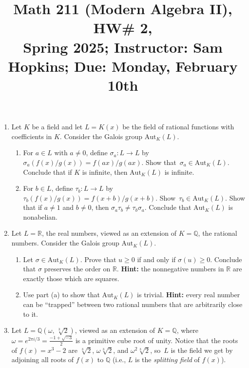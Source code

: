 \documentclass[11pt]{article}
\title{Math 211 (Modern Algebra II), HW\# 2, \\ {\normalsize Spring 2025; Instructor: Sam Hopkins; Due: Monday, February 10th}}
\date{}
\begin{document}
\maketitle

\thispagestyle{empty}

\begin{enumerate}

\item Let $K$ be a field and let $L=K(x)$ be the field of rational functions with coefficients in $K$. Consider the Galois group $\mathrm{Aut}_{K}(L)$.
\begin{enumerate}
\item For $a \in L$ with $a \neq 0$, define $\sigma_a \colon L \to L$ by $\sigma_a( f(x) / g(x) ) = f(ax) / g(ax)$. Show that~$\sigma_a \in \mathrm{Aut}_{K}(L)$. Conclude that if $K$ is infinite, then $\mathrm{Aut}_{K}(L)$ is infinite.
\item For $b \in L$, define $\tau_b\colon L \to L$ by $\tau_b(f(x)/g(x)) = f(x+b) / g(x+b)$. Show~$\tau_b \in \mathrm{Aut}_{K}(L)$. Show that if $a \neq 1$ and $b \neq 0$, then $\sigma_a \tau_b \neq \tau_b \sigma_a$. Conclude that $\mathrm{Aut}_{K}(L)$ is nonabelian.
\end{enumerate}

\item Let $L=\mathbb{R}$, the real numbers, viewed as an extension of $K=\mathbb{Q}$, the rational numbers. Consider the Galois group $\mathrm{Aut}_{K}(L)$.
\begin{enumerate}
\item Let $\sigma \in \mathrm{Aut}_{K}(L)$. Prove that $u \geq 0$ if and only if $\sigma(u) \geq 0$. Conclude that $\sigma$ preserves the order on $\mathbb{R}$. {\bf Hint:} the nonnegative numbers in $\mathbb{R}$ are exactly those which are squares.
\item Use part (a) to show that $\mathrm{Aut}_{K}(L)$ is trivial. {\bf Hint:} every real number can be ``trapped'' between two rational numbers that are arbitrarily close to it.
\end{enumerate}

\item Let $L = \mathbb{Q}(\omega, \, \sqrt[3]{2})$, viewed as an extension of $K=\mathbb{Q}$, where $\omega = e^{2\pi i / 3} = \frac{-1+\sqrt{-3}}{2}$ is a primitive cube root of unity.  Notice that the roots of $f(x)=x^3-2$ are $\sqrt[3]{2}$, $\omega\sqrt[3]{2}$, and $\omega^2\sqrt[3]{2}$, so~$L$ is the field we get by adjoining all roots of $f(x)$ to $\mathbb{Q}$ (i.e., $L$ is the \emph{splitting field} of $f(x)$).


\end{enumerate}
\end{document}
